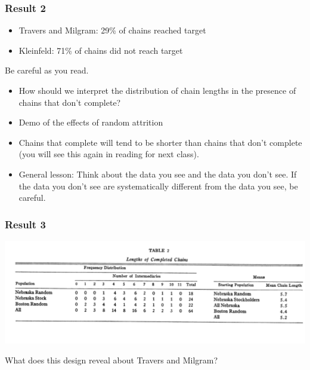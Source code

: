 \documentclass[aspectratio=169]{beamer}
\begin{document}
\begin{frame}
\frametitle{Result 2}

\begin{itemize}
\item Travers and Milgram: 29\% of chains reached target
\pause
\item Kleinfeld: 71\% of chains did not reach target
\end{itemize}

\pause
Be careful as you read.


\end{frame}
\begin{frame}

\begin{itemize}
\item How should we interpret the distribution of chain lengths in the presence of chains that don't complete?
\pause
\item Demo of the effects of random attrition
\pause
\item Chains that complete will tend to be shorter than chains that don't complete (you will see this again in reading for next class).
\pause
\item General lesson: Think about the data you see and the data you don't see.  If the data you don't see are systematically different from the data you see, be careful.
\end{itemize}

\end{frame}
\begin{frame}
\frametitle{Result 3}

\begin{center}
\includegraphics[height=0.6\textheight]{figures/travers_experimental_1969_tab2b}
\end{center}
\pause
\vfill
What does this design reveal about Travers and Milgram?

\end{frame}
\end{document}

